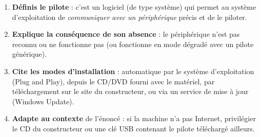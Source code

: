 \documentclass[11pt]{article}
\begin{document}
\begin{methode}
\begin{enumerate}
\item \textbf{Définis le pilote} : c'est un logiciel (de type système) qui permet au système d'exploitation de \emph{communiquer avec un périphérique} précis et de le piloter.
\item \textbf{Explique la conséquence de son absence} : le périphérique n'est pas reconnu ou ne fonctionne pas (ou fonctionne en mode dégradé avec un pilote générique).
\item \textbf{Cite les modes d'installation} : automatique par le système d'exploitation (Plug and Play), depuis le CD/DVD fourni avec le matériel, par téléchargement sur le site du constructeur, ou via un service de mise à jour (Windows Update).
\item \textbf{Adapte au contexte} de l'énoncé : si la machine n'a pas Internet, privilégier le CD du constructeur ou une clé USB contenant le pilote téléchargé ailleurs.
\end{enumerate}
\end{methode}
\end{document}
